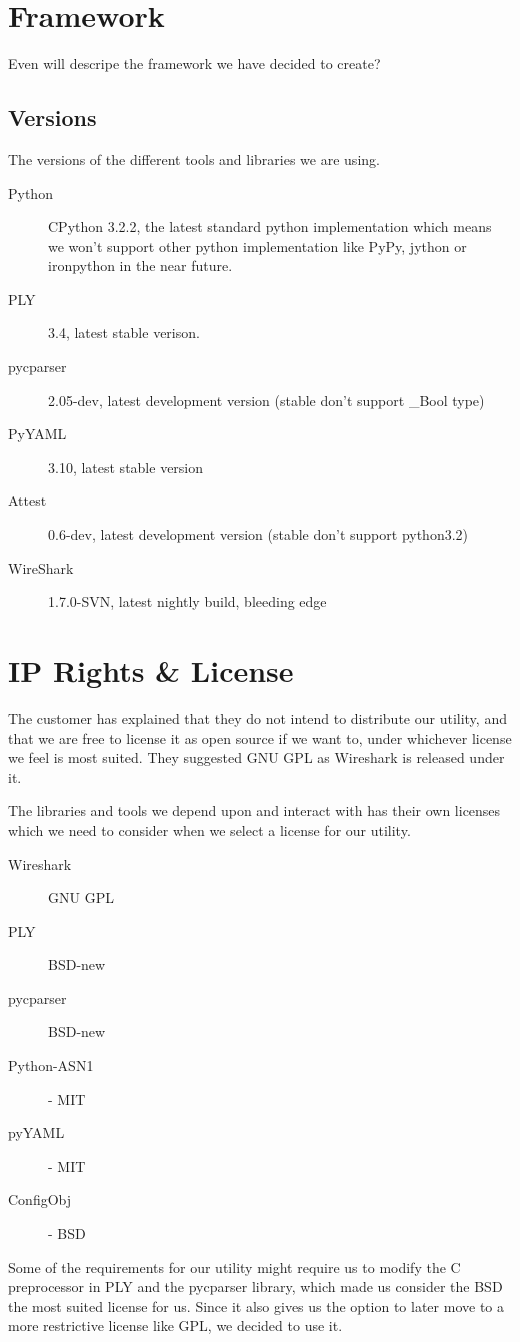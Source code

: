 \section{Framework}
\label{sec:pre:framework}
Even will descripe the framework we have decided to create?

\subsection{Versions}
The versions of the different tools and libraries we are using.
\begin{description}
	\item[Python] CPython 3.2.2, the latest standard python implementation
		which means we won’t support other python implementation like PyPy,
		jython or ironpython in the near future.
	\item[PLY] 3.4, latest stable verison.
	\item[pycparser] 2.05-dev, latest development version (stable don't
		support \_Bool type)
	\item[PyYAML] 3.10, latest stable version
	\item[Attest] 0.6-dev, latest development version (stable don’t
		support python3.2)
	\item[WireShark] 1.7.0-SVN, latest nightly build, bleeding edge
\end{description}

\section{IP Rights \& License}
\label{sec:pre:license}
The customer has explained that they do not intend to distribute our utility,
and that we are free to license it as open source if we want to, under
whichever license we feel is most suited. They suggested GNU GPL as Wireshark
is released under it.

The libraries and tools we depend upon and interact with has their own licenses
which we need to consider when we select a license for our utility.
\begin{description}
	\item[Wireshark] GNU GPL
	\item[PLY] BSD-new
	\item[pycparser] BSD-new
	\item[Python-ASN1] - MIT
	\item[pyYAML] - MIT
	\item[ConfigObj] - BSD
\end{description}

\noindent Some of the requirements for our utility might require us to modify
the C preprocessor in PLY and the pycparser library, which made us consider
the BSD the most suited license for us. Since it also gives us the option to
later move to a more restrictive license like GPL, we decided to use it.

